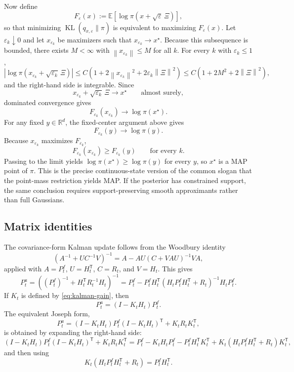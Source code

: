 \documentclass[11pt]{article}
\newcommand{\R}{\mathbb{R}}
\newcommand{\E}{\mathbb{E}}
\newcommand{\KL}{\operatorname{KL}}
\newcommand{\Id}{I}
\newcommand{\norm}[1]{\left\lVert #1 \right\rVert}
\newcommand{\abs}[1]{\left\lvert #1 \right\rvert}
\newcommand{\bracks}[1]{\left[ #1 \right]}
\newcommand{\parens}[1]{\left( #1 \right)}
\newcommand{\transpose}{^{\mathsf T}}
\numberwithin{equation}{section}
\theoremstyle{plain}
\theoremstyle{definition}
\theoremstyle{remark}
\begin{document}
Now define
\[
F_\varepsilon(x):=\E\bracks{\log \pi\parens{x+\sqrt{\varepsilon}\,\Xi}},
\]
so that minimizing $\KL(q_{x,\varepsilon}\|\pi)$ is equivalent to maximizing $F_\varepsilon(x)$. Let $\varepsilon_k\downarrow 0$ and let $x_{\varepsilon_k}$ be maximizers such that $x_{\varepsilon_k}\to x^\star$. Because this subsequence is bounded, there exists $M<\infty$ with $\norm{x_{\varepsilon_k}}\le M$ for all $k$. For every $k$ with $\varepsilon_k\le 1$,
\[
\abs{\log \pi\parens{x_{\varepsilon_k}+\sqrt{\varepsilon_k}\,\Xi}}
\le
C\parens{1+2\norm{x_{\varepsilon_k}}^2+2\varepsilon_k\norm{\Xi}^2}
\le
C\parens{1+2M^2+2\norm{\Xi}^2},
\]
and the right-hand side is integrable. Since
\[
x_{\varepsilon_k}+\sqrt{\varepsilon_k}\,\Xi\to x^\star
\qquad\text{almost surely},
\]
dominated convergence gives
\[
F_{\varepsilon_k}(x_{\varepsilon_k})\to \log \pi(x^\star).
\]
For any fixed $y\in\R^d$, the fixed-center argument above gives
\[
F_{\varepsilon_k}(y)\to \log \pi(y).
\]
Because $x_{\varepsilon_k}$ maximizes $F_{\varepsilon_k}$,
\[
F_{\varepsilon_k}(x_{\varepsilon_k})\ge F_{\varepsilon_k}(y)
\qquad\text{for every }k.
\]
Passing to the limit yields $\log \pi(x^\star)\ge \log \pi(y)$ for every $y$, so $x^\star$ is a MAP point of $\pi$. This is the precise continuous-state version of the common slogan that the point-mass restriction yields MAP. If the posterior has constrained support, the same conclusion requires support-preserving smooth approximants rather than full Gaussians.

\subsection{Matrix identities}
\label{app:matrix-identities}

The covariance-form Kalman update follows from the Woodbury identity
\[
\parens{A^{-1}+U C^{-1}V}^{-1}
=
A-AU\parens{C+VAU}^{-1}VA,
\]
applied with $A=P_t^f$, $U=H_t\transpose$, $C=R_t$, and $V=H_t$. This gives
\[
P_t^a
=
\parens{(P_t^f)^{-1}+H_t\transpose R_t^{-1}H_t}^{-1}
=
P_t^f - P_t^fH_t\transpose\parens{H_tP_t^fH_t\transpose+R_t}^{-1}H_tP_t^f.
\]
If $K_t$ is defined by \cref{eq:kalman-gain}, then
\[
P_t^a = (\Id-K_tH_t)P_t^f.
\]
The equivalent Joseph form,
\[
P_t^a
=
\parens{\Id-K_tH_t}P_t^f\parens{\Id-K_tH_t}\transpose + K_tR_tK_t\transpose,
\]
is obtained by expanding the right-hand side:
\[
\parens{\Id-K_tH_t}P_t^f\parens{\Id-K_tH_t}\transpose + K_tR_tK_t\transpose
=
P_t^f-K_tH_tP_t^f-P_t^fH_t\transpose K_t\transpose
+K_t\parens{H_tP_t^fH_t\transpose+R_t}K_t\transpose,
\]
and then using
\[
K_t\parens{H_tP_t^fH_t\transpose+R_t}=P_t^fH_t\transpose.
\]
\end{document}
